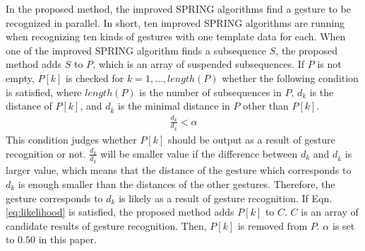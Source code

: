 \documentclass{sigchi-ext}
\begin{document}
        In the proposed method, the improved SPRING algorithms find a gesture to be recognized in parallel. In short, ten improved SPRING algorithms are running when recognizing ten kinds of gestures with one template data for each. When one of the improved SPRING algorithm finds a subsequence $S$, the proposed method adds $S$ to $P$, which is an array of suspended subsequences. If $P$ is not empty, $P[k]$ is checked for $k=1, \dots, length(P)$ whether the following condition is satisfied, where $length(P)$ is the number of subsequences in $P$, $d_k$ is the distance of $P[k]$, and $d_{\overline{k}}$ is the minimal distance in $P$ other than $P[k]$.
        \begin{eqnarray}
            \label{eq:likelihood}
            \frac{d_k}{d_{\overline{k}}} < \alpha
        \end{eqnarray}
        This condition judges whether $P[k]$ should be output as a result of gesture recognition or not. $\frac{d_k}{d_{\overline{k}}}$ will be smaller value if the difference between $d_k$ and $d_{\overline{k}}$ is larger value, which means that the distance of the gesture which corresponds to $d_k$ is enough smaller than the distances of the other gestures. Therefore, the gesture corresponds to $d_k$ is likely as a result of gesture recognition.
        If Eqn. \ref{eq:likelihood} is satisfied, the proposed method adds $P[k]$ to $C$. $C$ is an array of candidate results of gesture recognition. Then, $P[k]$ is removed from $P$. $ \alpha $ is set to $0.50$ in this paper. 
        
\end{document}
